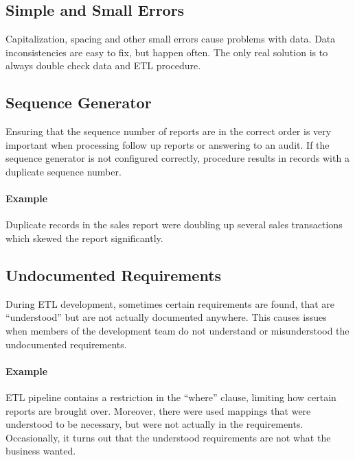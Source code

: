 \subsection*{Simple and Small Errors}

Capitalization, spacing and other small errors cause problems with data.
Data inconsistencies are easy to fix, but happen often.
The only real solution is to always double check data and ETL procedure.


\subsection*{Sequence Generator}

Ensuring that the sequence number of reports are in the correct order is very important when processing follow up reports or answering to an audit.
If the sequence generator is not configured correctly, procedure results in records with a duplicate sequence number.

\paragraph*{Example} Duplicate records in the sales report were doubling up several sales transactions which skewed the report significantly.


\subsection*{Undocumented Requirements}

During ETL development, sometimes certain requirements are found, that are \enquote{understood} but are not actually documented anywhere.
This causes issues when members of the development team do not understand or misunderstood the undocumented requirements.

\paragraph*{Example} ETL pipeline contains a restriction in the \enquote{where} clause, limiting how certain reports are brought over.
Moreover, there were used mappings that were understood to be necessary, but were not actually in the requirements.
Occasionally, it turns out that the understood requirements are not what the business wanted.


